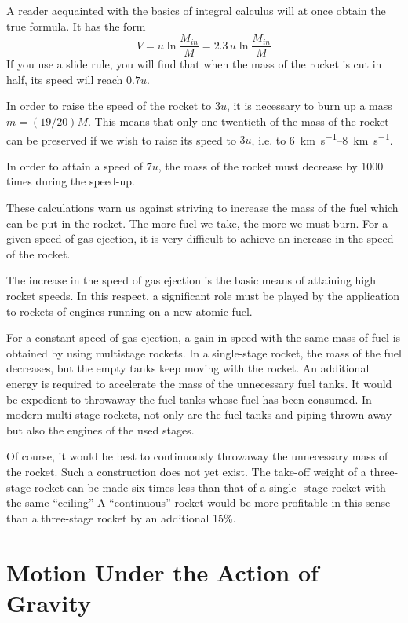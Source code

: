 A reader acquainted with the basics of integral calculus
will at once obtain the true formula. It has the form
\begin{equation*}%
V = u \ln \frac{M_{in}}{M} = 2.3 \, u \ln \frac{M_{in}}{M}
\label{rocket-eq}
\end{equation*}
If you use a slide rule, you will find that when the mass
of the rocket is cut in half, its speed will reach $0.7u$.

In order to raise the speed of the rocket to $3u$, it is
necessary to burn up a mass $m = (19/20) M$. This means
that only one-twentieth of the mass of the rocket can
be preserved if we wish to raise its speed to $3u$, i.e. to
\SIrange{6}{8}{\kilo\meter\per\second}.

In order to attain a speed of $7u$, the mass of the rocket
must decrease by 1000 times during the speed-up.

These calculations warn us against striving to increase
the mass of the fuel which can be put in the rocket. The
more fuel we take, the more we must burn. For a given
speed of gas ejection, it is very difficult to achieve an
increase in the speed of the rocket.

The increase in the speed of gas ejection is the basic
means of attaining high rocket speeds. In this respect, a significant role must be played by the application to rockets of engines running on a new atomic fuel.

For a constant speed of gas ejection, a gain in speed
with the same mass of fuel is obtained by using multistage rockets. In a single-stage rocket, the mass of the
fuel decreases, but the empty tanks keep moving with
the rocket. An additional energy is required to accelerate
the mass of the unnecessary fuel tanks. It would be
expedient to throwaway the fuel tanks whose fuel has
been consumed. In modern multi-stage rockets, not only
are the fuel tanks and piping thrown away but also the
engines of the used stages.

Of course, it would be best to continuously throwaway
the unnecessary mass of the rocket. Such a construction
does not yet exist. The take-off weight of a three-stage
rocket can be made six times less than that of a single-
stage rocket with the same ``ceiling'' A ``continuous''
rocket would be more profitable in this sense than a three-stage rocket by an additional 15\%.

\section{Motion Under the Action of Gravity}

